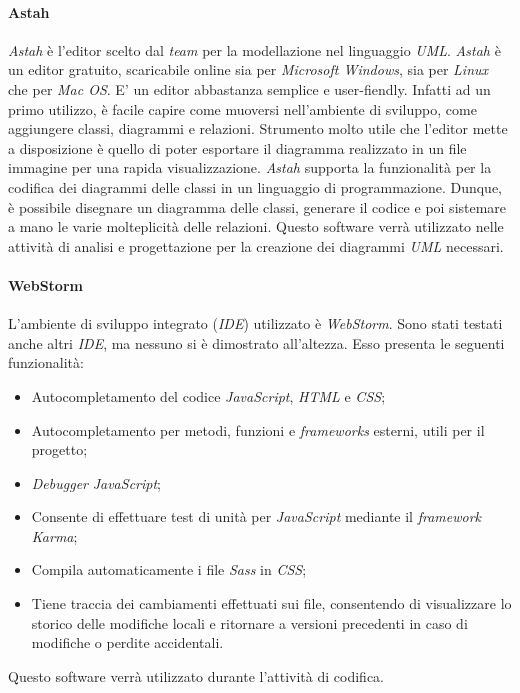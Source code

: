 \paragraph{Astah}
\textit{Astah} è l'editor scelto dal \textit{team} per la modellazione nel linguaggio \textit{UML}.
\textit{Astah} è un editor gratuito, scaricabile online sia per \textit{Microsoft Windows}, sia per \textit{Linux} che per \textit{Mac OS}.
E' un editor abbastanza semplice e user-fiendly. Infatti ad un  primo utilizzo, è facile capire come muoversi nell'ambiente di sviluppo, come aggiungere classi, diagrammi e relazioni.
Strumento molto utile che l'editor mette a disposizione è quello di poter esportare il diagramma realizzato in un file immagine per una rapida visualizzazione.
\textit{Astah} supporta la funzionalità per la codifica dei diagrammi delle classi in un linguaggio di programmazione. Dunque, è possibile disegnare un diagramma delle classi, generare il codice e poi sistemare a mano le varie molteplicità delle relazioni. Questo software verrà utilizzato nelle attività di analisi e progettazione per la creazione dei diagrammi \textit{UML} necessari.



\paragraph{WebStorm}
L'ambiente di sviluppo integrato (\textit{IDE}) utilizzato è \textit{WebStorm}. Sono stati testati anche altri \textit{IDE}, ma nessuno si è dimostrato all'altezza. Esso presenta le seguenti funzionalità:
\begin{itemize}
\item
Autocompletamento del codice \textit{JavaScript}, \textit{HTML} e \textit{CSS};
\item
Autocompletamento per metodi, funzioni e \textit{frameworks} esterni, utili per il progetto;
\item
\textit{Debugger} \textit{JavaScript};
\item
Consente di effettuare test di unità per \textit{JavaScript} mediante il \textit{framework} \textit{Karma};
\item
Compila automaticamente i file \textit{Sass} in \textit{CSS};
\item
Tiene traccia dei cambiamenti effettuati sui file, consentendo di visualizzare lo storico delle modifiche locali e ritornare a versioni precedenti in caso di modifiche o perdite accidentali.
\end{itemize}
Questo software verrà utilizzato durante l'attività di codifica.
